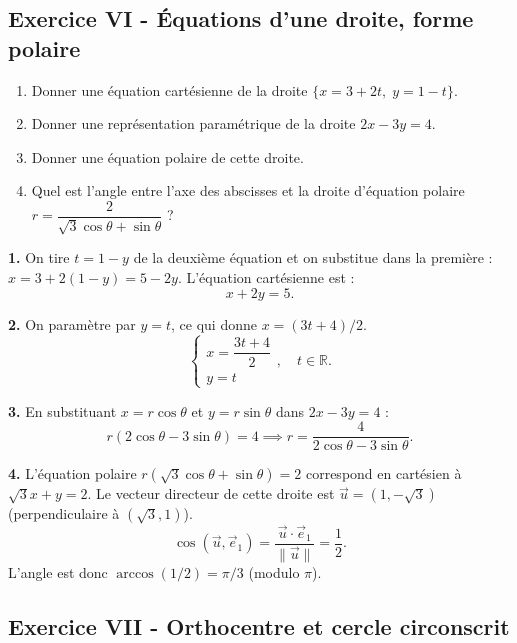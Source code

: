 \documentclass[12pt,a4paper]{article}
\begin{document}
\subsection*{Exercice VI - Équations d'une droite, forme polaire \niveau{\facile}}

\begin{boiteexercice}
\begin{enumerate}
  \item Donner une équation cartésienne de la droite $\bigl\{x=3+2t,\; y=1-t\bigr\}$.
  \item Donner une représentation paramétrique de la droite $2x-3y=4$.
  \item Donner une équation polaire de cette droite.
  \item Quel est l'angle entre l'axe des abscisses et la droite d'équation polaire
    $r = \dfrac{2}{\sqrt{3}\cos\theta+\sin\theta}$ ?
\end{enumerate}
\end{boiteexercice}

\begin{boitecorrige}
\textbf{1.} On tire $t = 1-y$ de la deuxième équation et on substitue dans la première :
$x = 3+2(1-y) = 5-2y$. L'équation cartésienne est :
\[
  \boxed{x+2y = 5.}
\]

\textbf{2.} On paramètre par $y=t$, ce qui donne $x = (3t+4)/2$.
\[
  \boxed{\begin{cases} x = \dfrac{3t+4}{2} \\[4pt] y = t \end{cases}, \quad t\in\mathbb{R}.}
\]

\textbf{3.} En substituant $x = r\cos\theta$ et $y = r\sin\theta$ dans $2x-3y=4$ :
\[
  r(2\cos\theta - 3\sin\theta) = 4 \implies \boxed{r = \frac{4}{2\cos\theta-3\sin\theta}.}
\]

\textbf{4.} L'équation polaire $r(\sqrt{3}\cos\theta+\sin\theta)=2$ correspond en cartésien à
$\sqrt{3}x+y=2$. Le vecteur directeur de cette droite est $\vec{u}=(1,-\sqrt{3})$
(perpendiculaire à $(\sqrt{3},1)$).
\[
  \cos(\vec{u},\vec{e}_1) = \frac{\vec{u}\cdot\vec{e}_1}{\|\vec{u}\|} = \frac{1}{2}.
\]
L'angle est donc $\arccos(1/2) = \pi/3$ (modulo $\pi$).
\end{boitecorrige}

\subsection*{Exercice VII - Orthocentre et cercle circonscrit \niveau{\difficile}}
\end{document}

